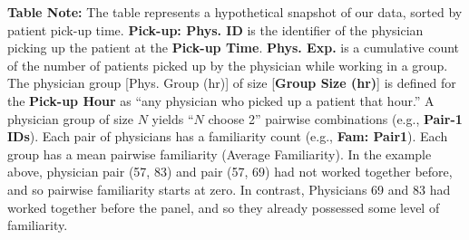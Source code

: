 \begin{table}[htbp]
{\begin{threeparttable}[t]
\begin{tablenotes}
      \item \textbf{Table Note:} The table represents a hypothetical snapshot of our data, sorted by patient pick-up time. \textbf{Pick-up: Phys. ID} is the identifier of the physician picking up the patient at the \textbf{Pick-up Time}. \textbf{Phys. Exp.} is a cumulative count of the number of patients picked up by the physician while working in a group. The physician group [Phys. Group (hr)] of size [\textbf{Group Size (hr)}] is defined for the \textbf{Pick-up Hour} as “any physician who picked up a patient that hour.” A physician group of size $N$ yields “$N$ choose 2” pairwise combinations (e.g., \textbf{Pair-1 IDs}). Each pair of physicians has a familiarity count (e.g., \textbf{Fam: Pair1}). Each group has a mean pairwise familiarity (Average Familiarity). In the example above, physician pair (57, 83) and pair (57, 69) had not worked together before, and so pairwise familiarity starts at zero. In contrast, Physicians 69 and 83 had worked together before the panel, and so they already possessed some level of familiarity.
    \end{tablenotes}
  \end{threeparttable} }
 \end{table}

